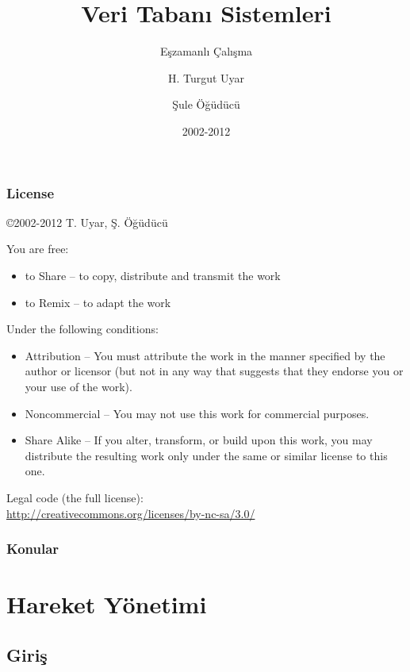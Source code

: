 \documentclass[dvipsnames]{beamer}
\title{Veri Tabanı Sistemleri}
\subtitle{Eşzamanlı Çalışma}
\author{H. Turgut Uyar \and Şule Öğüdücü}
\date{2002-2012}
\theoremstyle{definition}
\theoremstyle{example}
\theoremstyle{plain}
\begin{document}
\begin{frame}
  \titlepage
\end{frame}

\begin{frame}
  \frametitle{License}

  \hfill
  \copyright 2002-2012 T. Uyar, Ş. Öğüdücü

  \vfill
  \begin{tiny}
    You are free:
    \begin{itemize}
      \item to Share -- to copy, distribute and transmit the work
      \item to Remix -- to adapt the work
    \end{itemize}

    Under the following conditions:
    \begin{itemize}
      \item Attribution -- You must attribute the work in the manner specified by
        the author or licensor (but not in any way that suggests that they
        endorse you or your use of the work).

      \item Noncommercial -- You may not use this work for commercial purposes.

      \item Share Alike -- If you alter, transform, or build upon this work, you
        may distribute the resulting work only under the same or similar license
        to this one.
    \end{itemize}
  \end{tiny}

  \vfill
  Legal code (the full license):\\
  \url{http://creativecommons.org/licenses/by-nc-sa/3.0/}
\end{frame}

\begin{frame}
  \frametitle{Konular}
  \tableofcontents
\end{frame}

\section{Hareket Yönetimi}

\subsection{Giriş}
\end{document}
